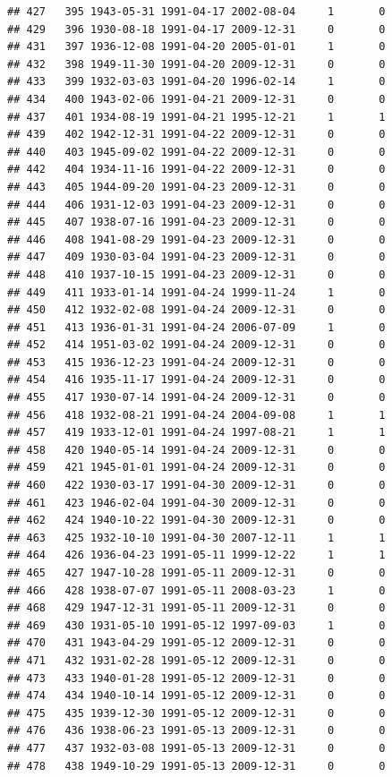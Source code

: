 \documentclass[
]{book}
\begin{document}
\begin{verbatim}
## 427   395 1943-05-31 1991-04-17 2002-08-04     1       0
## 429   396 1930-08-18 1991-04-17 2009-12-31     0       0
## 431   397 1936-12-08 1991-04-20 2005-01-01     1       0
## 432   398 1949-11-30 1991-04-20 2009-12-31     0       0
## 433   399 1932-03-03 1991-04-20 1996-02-14     1       0
## 434   400 1943-02-06 1991-04-21 2009-12-31     0       0
## 437   401 1934-08-19 1991-04-21 1995-12-21     1       1
## 439   402 1942-12-31 1991-04-22 2009-12-31     0       0
## 440   403 1945-09-02 1991-04-22 2009-12-31     0       0
## 442   404 1934-11-16 1991-04-22 2009-12-31     0       0
## 443   405 1944-09-20 1991-04-23 2009-12-31     0       0
## 444   406 1931-12-03 1991-04-23 2009-12-31     0       0
## 445   407 1938-07-16 1991-04-23 2009-12-31     0       0
## 446   408 1941-08-29 1991-04-23 2009-12-31     0       0
## 447   409 1930-03-04 1991-04-23 2009-12-31     0       0
## 448   410 1937-10-15 1991-04-23 2009-12-31     0       0
## 449   411 1933-01-14 1991-04-24 1999-11-24     1       0
## 450   412 1932-02-08 1991-04-24 2009-12-31     0       0
## 451   413 1936-01-31 1991-04-24 2006-07-09     1       0
## 452   414 1951-03-02 1991-04-24 2009-12-31     0       0
## 453   415 1936-12-23 1991-04-24 2009-12-31     0       0
## 454   416 1935-11-17 1991-04-24 2009-12-31     0       0
## 455   417 1930-07-14 1991-04-24 2009-12-31     0       0
## 456   418 1932-08-21 1991-04-24 2004-09-08     1       1
## 457   419 1933-12-01 1991-04-24 1997-08-21     1       1
## 458   420 1940-05-14 1991-04-24 2009-12-31     0       0
## 459   421 1945-01-01 1991-04-24 2009-12-31     0       0
## 460   422 1930-03-17 1991-04-30 2009-12-31     0       0
## 461   423 1946-02-04 1991-04-30 2009-12-31     0       0
## 462   424 1940-10-22 1991-04-30 2009-12-31     0       0
## 463   425 1932-10-10 1991-04-30 2007-12-11     1       1
## 464   426 1936-04-23 1991-05-11 1999-12-22     1       1
## 465   427 1947-10-28 1991-05-11 2009-12-31     0       0
## 466   428 1938-07-07 1991-05-11 2008-03-23     1       0
## 468   429 1947-12-31 1991-05-11 2009-12-31     0       0
## 469   430 1931-05-10 1991-05-12 1997-09-03     1       0
## 470   431 1943-04-29 1991-05-12 2009-12-31     0       0
## 471   432 1931-02-28 1991-05-12 2009-12-31     0       0
## 473   433 1940-01-28 1991-05-12 2009-12-31     0       0
## 474   434 1940-10-14 1991-05-12 2009-12-31     0       0
## 475   435 1939-12-30 1991-05-12 2009-12-31     0       0
## 476   436 1938-06-23 1991-05-13 2009-12-31     0       0
## 477   437 1932-03-08 1991-05-13 2009-12-31     0       0
## 478   438 1949-10-29 1991-05-13 2009-12-31     0       0

\end{verbatim}
\end{document}
